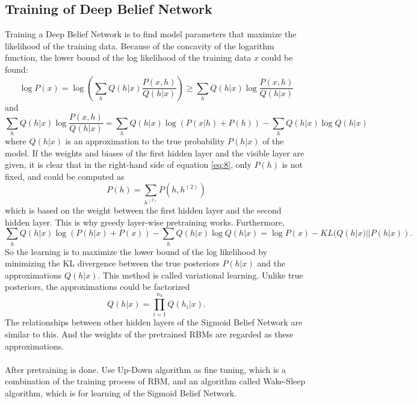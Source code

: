 \documentclass[12pt]{article}
\begin{document}
\subsection{Training of Deep Belief Network}
Training a Deep Belief Network is to find model parameters that maximize the likelihood of the training data. Because of the concavity of the logarithm function, the lower bound of the log likelihood of the training data $x$ could be found:\begin{equation}
\log P(x)=\log\left(\sum_h Q(h|x)\frac{P(x,h)}{Q(h|x)}\right)\geq \sum_h Q(h|x)\log\frac{P(x,h)}{Q(h|x)}
\end{equation}
and 
\begin{equation}\label{eq:8}
\sum_h Q(h|x)\log\frac{P(x,h)}{Q(h|x)}= \sum_h Q(h|x)\log(P(x|h) + P(h))-\sum_h Q(h|x)\log Q(h|x)
\end{equation}
where $Q(h|x)$ is an approximation to the true probability $P(h|x)$ of the model. If the weights and biases of the first hidden layer and the visible layer are given, it is clear that in the right-hand side of equation \eqref{eq:8}, only $P(h)$ is not fixed, and could be computed as \begin{equation}
P(h) = \sum_{h^{(2)}}P(h, h^{(2)})
\end{equation}
which is based on the weight between the first hidden layer and the second hidden layer. This is why greedy layer-wise pretraining works. Furthermore, \begin{equation}
\sum_h Q(h|x)\log(P(h|x) + P(x))-\sum_h Q(h|x)\log Q(h|x) = \log P(x) - KL(Q(h|x)||P(h|x)).
\end{equation}
So the learning is to maximize the lower bound of the log likelihood by minimizing the KL divergence between the true posteriors $P(h|x)$ and the approximations $Q(h|x)$. This method is called variational learning. Unlike true posteriors, the approximations could be factorized\begin{equation}
Q(h|x)=\prod_{i=1}^{n_h} Q(h_i|x).
\end{equation}
The relationships between other hidden layers of the Sigmoid Belief Network are similar to this. And the weights of the pretrained RBMs are regarded as these approximations.\\
\\
After pretraining is done. Use Up-Down algorithm as fine tuning, which is a combination of the training process of RBM, and an algorithm called Wake-Sleep algorithm, which is for learning of the Sigmoid Belief Network.
\end{document}
